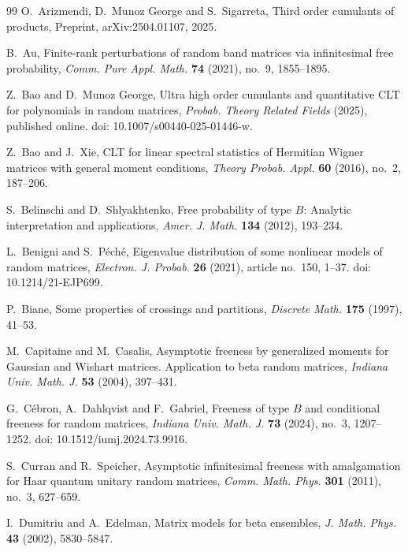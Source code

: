 \documentclass{article}
\theoremstyle{definition}
\begin{document}
{\begin{thebibliography}{99}
O.~Arizmendi, D.~Munoz George and S.~Sigarreta,
\newblock Third order cumulants of products,
\newblock Preprint, arXiv:2504.01107, 2025.

B.~Au,
\newblock Finite-rank perturbations of random band matrices
via infinitesimal free probability,
\newblock \emph{Comm. Pure Appl. Math.}
\textbf{74} (2021), no.~9, 1855--1895.

Z.~Bao and D.~Munoz George,
\newblock Ultra high order cumulants and quantitative CLT
for polynomials in random matrices,
\newblock \emph{Probab. Theory Related Fields}
(2025), published online.
\newblock doi: 10.1007/s00440-025-01446-w.

Z.~Bao and J.~Xie,
\newblock CLT for linear spectral statistics of Hermitian Wigner
matrices with general moment conditions,
\newblock \emph{Theory Probab. Appl.}
\textbf{60} (2016), no.~2, 187--206.

S.~Belinschi and D.~Shlyakhtenko,
\newblock Free probability of type $B$: Analytic interpretation
and applications,
\newblock \emph{Amer. J. Math.}
\textbf{134} (2012), 193--234.

L.~Benigni and S.~P\'ech\'e,
\newblock Eigenvalue distribution of some nonlinear models
of random matrices,
\newblock \emph{Electron. J. Probab.}
\textbf{26} (2021), article no.~150, 1--37.
\newblock doi: 10.1214/21-EJP699.

P.~Biane,
\newblock Some properties of crossings and partitions,
\newblock \emph{Discrete Math.}
\textbf{175} (1997), 41--53.

M.~Capitaine and M.~Casalis,
\newblock Asymptotic freeness by generalized moments for Gaussian
and Wishart matrices. Application to beta random matrices,
\newblock \emph{Indiana Univ. Math. J.}
\textbf{53} (2004), 397--431.

G.~C\'ebron, A.~Dahlqvist and F.~Gabriel,
\newblock Freeness of type $B$ and conditional freeness
for random matrices,
\newblock \emph{Indiana Univ. Math. J.}
\textbf{73} (2024), no.~3, 1207--1252.
\newblock doi: 10.1512/iumj.2024.73.9916.

S.~Curran and R.~Speicher,
\newblock Asymptotic infinitesimal freeness with amalgamation
for Haar quantum unitary random matrices,
\newblock \emph{Comm. Math. Phys.}
\textbf{301} (2011), no.~3, 627--659.

I.~Dumitriu and A.~Edelman,
\newblock Matrix models for beta ensembles,
\newblock \emph{J. Math. Phys.}
\textbf{43} (2002), 5830--5847.


\end{thebibliography}}
\end{document}
